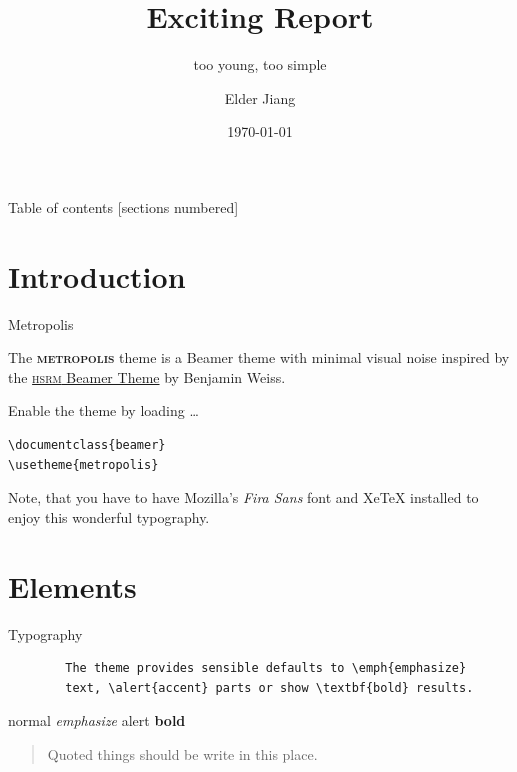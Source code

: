 \documentclass[10pt]{beamer}
\title{Exciting Report}
\subtitle{too young, too simple}
\date{\today}
\author{Elder Jiang}
\institute{Peking University 北京大学}
\newcommand{\themename}{\textbf{\textsc{metropolis}}\xspace}
\begin{document}
\maketitle


\begin{frame}{Table of contents}
  [sections numbered]
  \tableofcontents[hideallsubsections]
\end{frame}



\section{Introduction}



\begin{frame}[fragile]{Metropolis}

  The \themename theme is a Beamer theme with minimal visual noise
  inspired by the \href{https://github.com/hsrmbeamertheme/hsrmbeamertheme}{\textsc{hsrm} Beamer
  Theme} by Benjamin Weiss.

  Enable the theme by loading \ldots

\begin{verbatim}    
\documentclass{beamer}
\usetheme{metropolis}
\end{verbatim}
  
  Note, that you have to have Mozilla's \emph{Fira Sans} font and XeTeX
  installed to enjoy this wonderful typography.
\end{frame}



\section{Elements}



\begin{frame}[fragile]{Typography}
	\begin{verbatim}
		The theme provides sensible defaults to \emph{emphasize} 
		text, \alert{accent} parts or show \textbf{bold} results.
	\end{verbatim}

	\begin{center}
		normal
		\emph{emphasize}
		\alert{alert}
		\textbf{bold}
	\end{center}
	
	\begin{quote}
    Quoted things should be write in this place.
  	\end{quote}

\end{frame}
\end{document}
